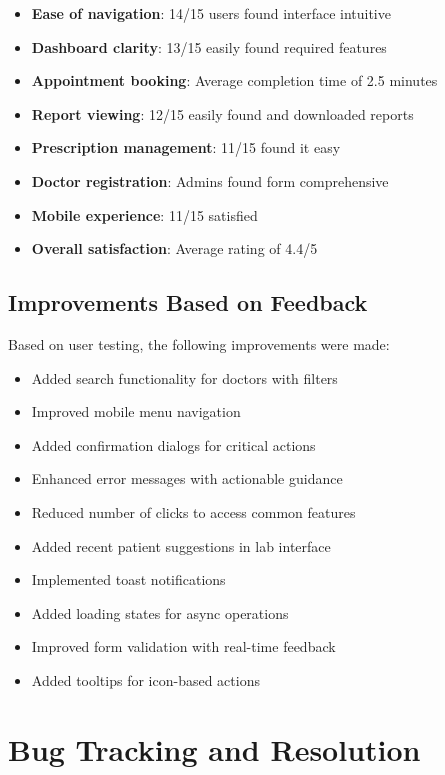 \begin{itemize}
    \item \textbf{Ease of navigation}: 14/15 users found interface intuitive
    \item \textbf{Dashboard clarity}: 13/15 easily found required features
    \item \textbf{Appointment booking}: Average completion time of 2.5 minutes
    \item \textbf{Report viewing}: 12/15 easily found and downloaded reports
    \item \textbf{Prescription management}: 11/15 found it easy
    \item \textbf{Doctor registration}: Admins found form comprehensive
    \item \textbf{Mobile experience}: 11/15 satisfied
    \item \textbf{Overall satisfaction}: Average rating of 4.4/5
\end{itemize}

\subsection{Improvements Based on Feedback}
Based on user testing, the following improvements were made:

\begin{itemize}
    \item Added search functionality for doctors with filters
    \item Improved mobile menu navigation
    \item Added confirmation dialogs for critical actions
    \item Enhanced error messages with actionable guidance
    \item Reduced number of clicks to access common features
    \item Added recent patient suggestions in lab interface
    \item Implemented toast notifications
    \item Added loading states for async operations
    \item Improved form validation with real-time feedback
    \item Added tooltips for icon-based actions
\end{itemize}

\section{Bug Tracking and Resolution}

